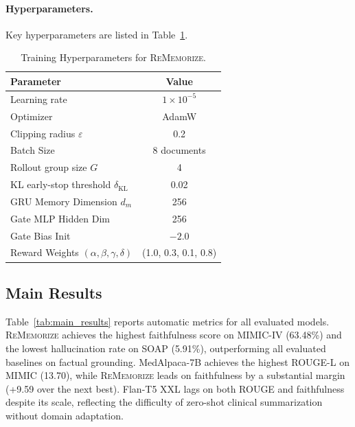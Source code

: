 \documentclass{article}
\begin{document}
\paragraph{Hyperparameters.}
Key hyperparameters are listed in Table~\ref{tab:hyperparams}.

\begin{table}[h]
\centering
\caption{Training Hyperparameters for \textsc{ReMemorize}.}
\label{tab:hyperparams}
\begin{tabular}{lc}
\toprule
Parameter & Value \\
\midrule
Learning rate & \(1 \times 10^{-5}\) \\
Optimizer & AdamW \\
Clipping radius $\varepsilon$ & 0.2 \\
Batch Size & 8 documents \\
Rollout group size $G$ & 4 \\
KL early-stop threshold $\delta_{\mathrm{KL}}$ & 0.02 \\
GRU Memory Dimension \(d_m\) & 256 \\
Gate MLP Hidden Dim & 256 \\
Gate Bias Init & $-2.0$ \\
Reward Weights \((\alpha,\beta,\gamma,\delta)\) & (1.0, 0.3, 0.1, 0.8) \\
\bottomrule
\end{tabular}
\end{table}

\subsection{Main Results}
\label{sec:main_results}

Table~\ref{tab:main_results} reports automatic metrics for all evaluated models.
\textsc{ReMemorize} achieves the highest faithfulness score on MIMIC-IV (63.48\%) and the lowest hallucination rate on SOAP (5.91\%), outperforming all evaluated baselines on factual grounding. MedAlpaca-7B achieves the highest ROUGE-L on MIMIC (13.70), while \textsc{ReMemorize} leads on faithfulness by a substantial margin (+9.59 over the next best). Flan-T5 XXL lags on both ROUGE and faithfulness despite its scale, reflecting the difficulty of zero-shot clinical summarization without domain adaptation.
\end{document}
